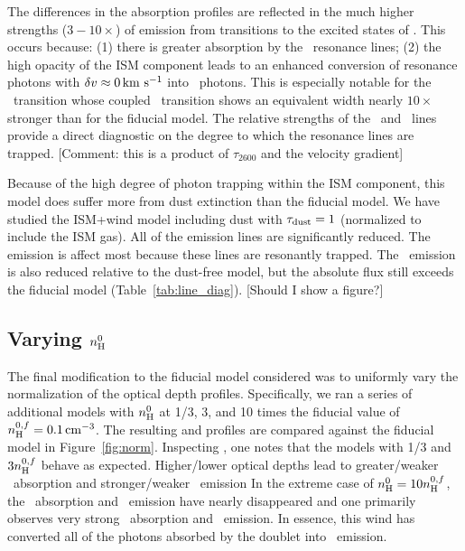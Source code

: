 \documentclass[12pt,preprint]{aastex}
\begin{document}
The differences in the  absorption profiles are reflected
in the much higher strengths ($3-10\times$) of emission from
transitions to the excited states of \aconfig.   This occurs because:
(1) there is greater absorption by the \feiid\
resonance lines; (2) the high opacity of the ISM component leads to
an enhanced conversion of resonance photons with $\delta v \approx 0\, {\rm km~s^{-1}}$
into \feiis\ photons.  This is especially notable for the
\feiib\ transition whose coupled \feiis\ transition shows an equivalent width nearly
$10\times$ stronger than for the fiducial model.  The relative
strengths of the \feiib\ and \feiie\ lines provide a direct
diagnostic on the degree to which the resonance lines are trapped.
[Comment:  this is a product of $\tau_{2600}$ and the velocity
gradient]

Because of the high degree of photon trapping within the ISM
component, this model does suffer more from dust extinction than the
fiducial model.  We have studied the ISM+wind model including dust
with $\tau_{\rm dust}=1$ (normalized to include the ISM gas).  All of the 
emission lines are significantly reduced.  The \ion{Mg}{2} emission is
affect most because these lines are resonantly trapped.  The \feiis\
emission is also reduced relative to the dust-free model, but the
absolute flux still exceeds the fiducial model
(Table~\ref{tab:line_diag}).
[Should I show a figure?] 

\subsection{Varying $n_{\rm H}^0$}

The final modification to the fiducial model considered was to
uniformly vary the normalization of the optical depth profiles.
Specifically, we ran a series of additional models with $n_{\rm H}^0$ at
1/3, 3, and 10 times the fiducial value of $n_{\rm H}^{0,f} = 0.1 \, {\rm cm^{-3}}$.
The resulting  and \ion{Fe}{2} profiles are compared
against the fiducial model in Figure~\ref{fig:norm}.  Inspecting
\ion{Mg}{2}, one notes that the models with 1/3 and $3 n_{\rm H}^{0,f}$
behave as expected.  Higher/lower optical depths lead to
greater/weaker \mgiia\ absorption and stronger/weaker \mgiib\ emission
In the extreme case of
$n_{\rm H}^0 = 10 n_{\rm H}^{0,f}$, the \mgiib\ absorption and \mgiia\
emission have nearly disappeared and one primarily observes very
strong \mgiia\ absorption and \mgiib\ emission.
In essence, this wind has converted all of the photons absorbed by the
\ion{Mg}{2} doublet into \mgiib\ emission.
\end{document}
